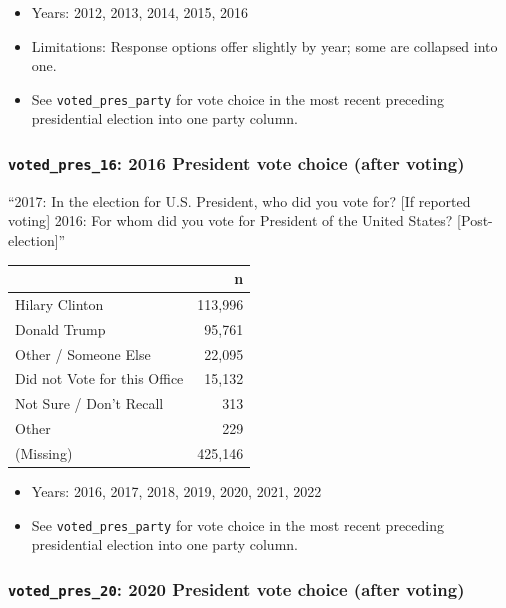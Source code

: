 \documentclass[10pt,article,oneside]{memoir}
\theoremstyle{definition}
\begin{document}
\begin{itemize}
\tightlist
\item
  Years: 2012, 2013, 2014, 2015, 2016
\item
  Limitations: Response options offer slightly by year; some are
  collapsed into one.
\item
  See \texttt{voted\_pres\_party} for vote choice in the most recent
  preceding presidential election into one party column.
\end{itemize}

\subsubsection{\texorpdfstring{\texttt{voted\_pres\_16}: 2016 President
vote choice (after
voting)}{voted\_pres\_16: 2016 President vote choice (after voting)}}\label{voted_pres_16-2016-president-vote-choice-after-voting}

``2017: In the election for U.S. President, who did you vote for? {[}If
reported voting{]} 2016: For whom did you vote for President of the
United States? {[}Post-election{]}''

\begin{table}[H]
\centering
\begin{tabular}[t]{lr}
\toprule
 & n\\
\midrule
Hilary Clinton & 113,996\\
Donald Trump & 95,761\\
Other / Someone Else & 22,095\\
Did not Vote for this Office & 15,132\\
Not Sure / Don't Recall & 313\\
Other & 229\\
(Missing) & 425,146\\
\bottomrule
\end{tabular}
\end{table}

\begin{itemize}
\tightlist
\item
  Years: 2016, 2017, 2018, 2019, 2020, 2021, 2022
\item
  See \texttt{voted\_pres\_party} for vote choice in the most recent
  preceding presidential election into one party column.
\end{itemize}

\subsubsection{\texorpdfstring{\texttt{voted\_pres\_20}: 2020 President
vote choice (after
voting)}{voted\_pres\_20: 2020 President vote choice (after voting)}}\label{voted_pres_20-2020-president-vote-choice-after-voting}
\end{document}
